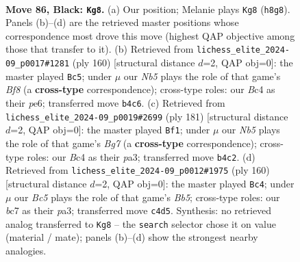 \documentclass[11pt]{article}
\begin{document}
\clearpage

\begin{figure}[p]\centering
\begin{subfigure}{0.46\textwidth}\centering
\resizebox{\linewidth}{!}{%
\newchessgame
\chessboard[
  setfen={7k/2B5/8/8/1nb5/7K/5P2/8 b - - 18 86},
  showmover=false,
  pgfstyle=straightmove, color=movearrow, markmove={h8-g8}
]}
\caption{}
\end{subfigure}\hfill
\begin{subfigure}{0.46\textwidth}\centering
\resizebox{\linewidth}{!}{%
\newchessgame
\chessboard[
  setfen={2k2B2/8/4p3/8/8/4K3/6b1/8 w - - 57 81},
  showmover=false,
  pgfstyle=straightmove, color=movearrow, markmove={f8-c5}
]}
\caption{}
\end{subfigure}
\\[4pt]
\begin{subfigure}{0.46\textwidth}\centering
\resizebox{\linewidth}{!}{%
\newchessgame
\chessboard[
  setfen={4B3/8/8/8/3k4/P7/2K3b1/8 b - - 4 91},
  showmover=false,
  pgfstyle=straightmove, color=movearrow, markmove={g2-f1}
]}
\caption{}
\end{subfigure}\hfill
\begin{subfigure}{0.46\textwidth}\centering
\resizebox{\linewidth}{!}{%
\newchessgame
\chessboard[
  setfen={8/8/5N2/1B6/7K/p3k3/8/8 w - - 0 81},
  showmover=false,
  pgfstyle=straightmove, color=movearrow, markmove={b5-c4}
]}
\caption{}
\end{subfigure}
\caption{\textbf{Move 86, Black: \texttt{Kg8}.} (a) Our position; Melanie plays \texttt{Kg8} (\texttt{h8g8}). Panels (b)--(d) are the retrieved master positions whose correspondence most drove this move (highest QAP objective among those that transfer to it). (b) Retrieved from \texttt{lichess\_elite\_2024-09\_p0017\#1281} (ply 160) [structural distance $d$=2, QAP obj=0]: the master played \texttt{Bc5}; under $\mu$ our \emph{Nb5} plays the role of that game's \emph{Bf8} (a \textbf{cross-type} correspondence); cross-type roles: our \emph{B}c4 as their \emph{p}e6; transferred move \texttt{b4c6}. (c) Retrieved from \texttt{lichess\_elite\_2024-09\_p0019\#2699} (ply 181) [structural distance $d$=2, QAP obj=0]: the master played \texttt{Bf1}; under $\mu$ our \emph{Nb5} plays the role of that game's \emph{Bg7} (a \textbf{cross-type} correspondence); cross-type roles: our \emph{B}c4 as their \emph{p}a3; transferred move \texttt{b4c2}. (d) Retrieved from \texttt{lichess\_elite\_2024-09\_p0012\#1975} (ply 160) [structural distance $d$=2, QAP obj=0]: the master played \texttt{Bc4}; under $\mu$ our \emph{Bc5} plays the role of that game's \emph{Bb5}; cross-type roles: our \emph{b}c7 as their \emph{p}a3; transferred move \texttt{c4d5}. Synthesis: no retrieved analog transferred to \texttt{Kg8} -- the \texttt{search} selector chose it on value (material / mate); panels (b)--(d) show the strongest nearby analogies.}
\label{fig:thought-m171}
\end{figure}
\end{document}
